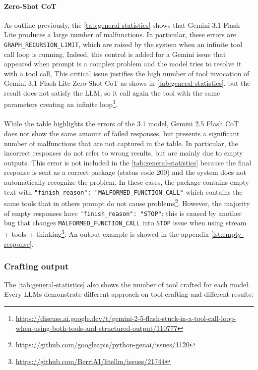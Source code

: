 \documentclass[12pt,a4paper,openright,twoside]{book}
\begin{document}
\paragraph{Zero-Shot CoT}{As outline previously, the \cref{tab:general-statistics} shows that Gemini 3.1 Flash Lite produces a large number of malfunctions. 
In particular, these errors are \texttt{GRAPH\_RECURSION\_LIMIT}, which are raised by the system when an infinite tool call loop is running. 
Indeed, this control is added for a Gemini issue that appeared when prompt is a complex problem and the model tries to resolve it with a tool call, 
This critical issue justifies the high number of tool invocation of Gemini 3.1 Flash Lite Zero-Shot CoT as shows in \cref{tab:general-statistics}. 
but the result does not satisfy the \ac{LLM}, so it call again the tool with the same parameters creating an infinite loop\footnote{\url{https://discuss.ai.google.dev/t/gemini-2-5-flash-stuck-in-a-tool-call-loop-when-using-both-tools-and-structured-output/110777}}. 
\\\\
While the table highlights the errors of the 3.1 model, Gemini 2.5 Flash CoT does not show the same amount of failed responses, but presents a significant number of malfunctions that are not captured in the table.
In particular, the incorrect responses do not refer to wrong results, but are mainly due to empty outputs. 
This error is not included in the \cref{tab:general-statistics} because the final response is sent as a correct package (status code 200) and the system does not automatically recognize the problem.
In these cases, the package contains empty text with \texttt{"finish\_reason": "MALFORMED\_FUNCTION\_CALL"} which contains the same tools that in others prompt do not cause problems\footnote{\url{https://github.com/googleapis/python-genai/issues/1120}}. 
However, the majority of empty responses have \texttt{"finish\_reason": "STOP"}; this is caused by another bug that changes \texttt{MALFORMED\_FUNCTION\_CALL} into \texttt{STOP} issue when using stream + tools + thinking\footnote{\url{https://github.com/BerriAI/litellm/issues/21744}}.
An output example is showed in the appendix \cref{lst:empty-response}.}

\subsubsection{Crafting output}
The \cref{tab:general-statistics} also shows the number of tool crafted for each model. Every \acp{LLM} demonstrate different approach on tool crafting and different results:
\end{document}
